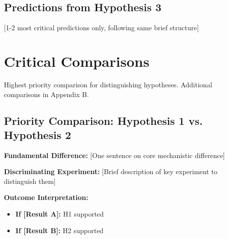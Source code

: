 \documentclass[11pt,letterpaper]{article}
\begin{document}
\vspace{0.3cm}

\subsection*{Predictions from Hypothesis 3}

\begin{predictionbox}

[1-2 most critical predictions only, following same brief structure]

\end{predictionbox}



\section{Critical Comparisons}

Highest priority comparison for distinguishing hypotheses. Additional comparisons in Appendix B.

\subsection*{Priority Comparison: Hypothesis 1 vs. Hypothesis 2}

\begin{comparisonbox}

\textbf{Fundamental Difference:} [One sentence on core mechanistic difference]

\vspace{0.2cm}

\textbf{Discriminating Experiment:} [Brief description of key experiment to distinguish them]

\vspace{0.2cm}

\textbf{Outcome Interpretation:}
\begin{itemize}
  \item \textbf{If [Result A]:} H1 supported
  \item \textbf{If [Result B]:} H2 supported
\end{itemize}

\end{comparisonbox}
\end{document}
